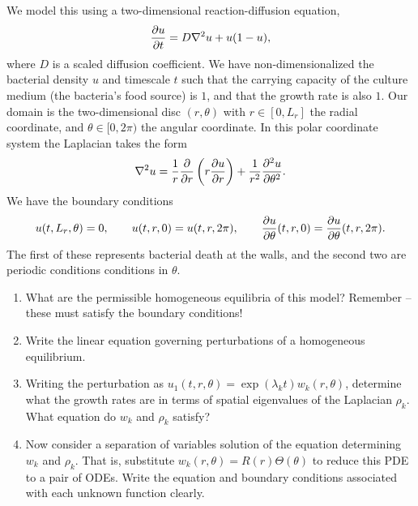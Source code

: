 \documentclass[a4paper,12pt]{article}
\begin{document}
\begin{enumerate}
We model this using a two-dimensional reaction-diffusion equation,
\begin{equation}
    \pd{u}{t} = D\nabla^2 u + u(1-u),
\end{equation}
where $D$ is a scaled diffusion coefficient. We have non-dimensionalized the bacterial density $u$ and timescale $t$ such that the carrying capacity of the culture medium (the bacteria's food source) is $1$, and that the growth rate is also $1$. Our domain is the two-dimensional disc $(r,\theta)$ with $r\in [0, L_r]$ the radial coordinate, and $\theta\in [0, 2\pi)$ the angular coordinate. In this polar coordinate system the Laplacian takes the form
\begin{equation}
\nabla^2u  = \frac{1}{r}\pd{}{r}\left(r \pd{u}{r}\right) + \frac{1}{r^2}\pdd{u}{\theta}.
\end{equation}
We have the boundary conditions
\begin{equation}
    {u}(t,L_r,\theta) = 0,\qquad {u}(t,r,0) ={u}(t,r,2\pi),\qquad  \pd{u}{\theta}(t,r,0) = \pd{u}{\theta}(t,r,2\pi).
\end{equation}
The first of these represents bacterial death at the walls, and the second two are periodic conditions conditions in $\theta$.
\begin{enumerate}
    \item What are the permissible homogeneous equilibria of this model? Remember -- these must satisfy the boundary conditions!
    \item Write the linear equation governing perturbations of a homogeneous equilibrium. 
    \item Writing the perturbation as $u_1(t,r,\theta) = \exp(\lambda_k t)w_k(r,\theta)$, determine what the growth rates are in terms of spatial eigenvalues of the Laplacian $\rho_k$. What equation do $w_k$ and $\rho_k$ satisfy?
    \item Now consider a separation of variables solution of the equation determining $w_k$ and $\rho_k$. That is, substitute $w_k(r,\theta) = R(r)\Theta(\theta)$ to reduce this PDE to a pair of ODEs. Write the equation and boundary conditions associated with each unknown function clearly.

\end{enumerate}
\end{enumerate}
\end{document}
